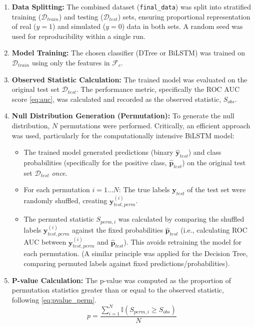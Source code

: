 \begin{enumerate}
    \item \textbf{Data Splitting:} The combined dataset (\texttt{final\_data}) was split into stratified training ($\mathcal{D}_{train}$) and testing ($\mathcal{D}_{test}$) sets, ensuring proportional representation of real ($y=1$) and simulated ($y=0$) data in both sets. A random seed was used for reproducibility within a single run.
    \item \textbf{Model Training:} The chosen classifier (DTree or BiLSTM) was trained on $\mathcal{D}_{train}$ using only the features in $\mathcal{F}_c$.
    \item \textbf{Observed Statistic Calculation:} The trained model was evaluated on the original test set $\mathcal{D}_{test}$. The performance metric, specifically the ROC AUC score \autoref{eq:auc}, was calculated and recorded as the observed statistic, $S_{obs}$.
    \item \textbf{Null Distribution Generation (Permutation):} To generate the null distribution, $N$ permutations were performed. Critically, an efficient approach was used, particularly for the computationally intensive BiLSTM model:
          \begin{itemize}
              \item The trained model generated predictions (binary $\hat{\mathbf{y}}_{test}$) and class probabilities (specifically for the positive class, $\hat{\mathbf{p}}_{test}$) on the original test set $\mathcal{D}_{test}$ \textit{once}.
              \item For each permutation $i=1...N$: The true labels $\mathbf{y}_{test}$ of the test set were randomly shuffled, creating $\mathbf{y}_{test, perm}^{(i)}$.
              \item The permuted statistic $S_{perm, i}$ was calculated by comparing the shuffled labels $\mathbf{y}_{test, perm}^{(i)}$ against the fixed probabilities $\hat{\mathbf{p}}_{test}$ (i.e., calculating ROC AUC between $\mathbf{y}_{test, perm}^{(i)}$ and $\hat{\mathbf{p}}_{test}$). This avoids retraining the model for each permutation. (A similar principle was applied for the Decision Tree, comparing permuted labels against fixed predictions/probabilities).
          \end{itemize}
    \item \textbf{P-value Calculation:} The p-value was computed as the proportion of permutation statistics greater than or equal to the observed statistic, following \autoref{eq:pvalue_perm}.
          \begin{equation}
              p = \frac{\sum_{i=1}^{N} \mathbb{I}(S_{perm, i} \ge S_{obs})}{N}
              \nonumber
          \end{equation}
\end{enumerate}

